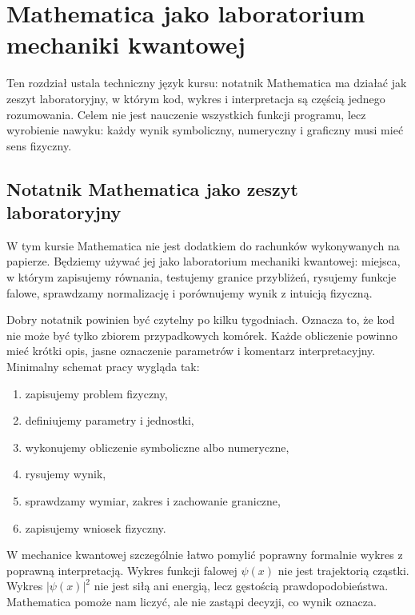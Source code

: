 \chapter{Mathematica jako laboratorium mechaniki kwantowej}

\begin{remarkbox}
Ten rozdział ustala techniczny język kursu: notatnik Mathematica ma działać jak
zeszyt laboratoryjny, w którym kod, wykres i interpretacja są częścią jednego
rozumowania. Celem nie jest nauczenie wszystkich funkcji programu, lecz
wyrobienie nawyku: każdy wynik symboliczny, numeryczny i graficzny musi mieć
sens fizyczny.
\end{remarkbox}

\section{Notatnik Mathematica jako zeszyt laboratoryjny}

W tym kursie Mathematica nie jest dodatkiem do rachunków wykonywanych na papierze. Będziemy używać jej jako laboratorium mechaniki kwantowej: miejsca, w którym zapisujemy równania, testujemy granice przybliżeń, rysujemy funkcje falowe, sprawdzamy normalizację i porównujemy wynik z intuicją fizyczną.

Dobry notatnik powinien być czytelny po kilku tygodniach. Oznacza to, że kod nie może być tylko zbiorem przypadkowych komórek. Każde obliczenie powinno mieć krótki opis, jasne oznaczenie parametrów i komentarz interpretacyjny. Minimalny schemat pracy wygląda tak:
\begin{enumerate}
    \item zapisujemy problem fizyczny,
    \item definiujemy parametry i jednostki,
    \item wykonujemy obliczenie symboliczne albo numeryczne,
    \item rysujemy wynik,
    \item sprawdzamy wymiar, zakres i zachowanie graniczne,
    \item zapisujemy wniosek fizyczny.
\end{enumerate}

W mechanice kwantowej szczególnie łatwo pomylić poprawny formalnie wykres z poprawną interpretacją. Wykres funkcji falowej \(\psi(x)\) nie jest trajektorią cząstki. Wykres \(|\psi(x)|^2\) nie jest siłą ani energią, lecz gęstością prawdopodobieństwa. Mathematica pomoże nam liczyć, ale nie zastąpi decyzji, co wynik oznacza.

